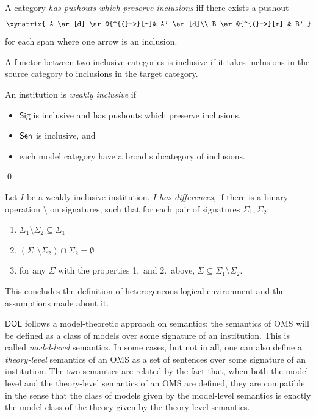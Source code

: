 \documentclass[10pt,fleqn,final]{scrreprt}
\newcommand{\cbs}[0]{\color{red}\xspace} %
\newcommand{\cbe}[0]{\color{black}\xspace} %
\newcommand{\Sig}{\mathsf{Sig}}
\newcommand*{\DOL}{\ensuremath{\mathsf{DOL}}\xspace}
\newenvironment{definitions}[0]{\medskip }{}
\begin{document}
\begin{definitions}
\noindent
A category \emph{has pushouts which preserve inclusions} iff 
there exists a pushout
$$
\xymatrix{
  A  \ar[d] \ar@{^{(}->}[r]& A' \ar[d]\\
  B \ar@{^{(}->}[r] & B'
}
$$ for each span where one arrow is an inclusion.

A functor between two inclusive categories is inclusive if it takes inclusions in the source category to inclusions in the target category.

\begin{definition}
 An institution is \emph{weakly inclusive} if
   \begin{itemize}
     \item $\Sig$ is inclusive and has pushouts which preserve inclusions,
     \item $\mathsf{Sen}$ is inclusive, and
     \item each model category have a broad subcategory of inclusions.
   \end{itemize}
\qed\end{definition}

Let $I$ be a weakly inclusive institution.  $I$  \emph{has differences}, if there is a binary operation $\setminus$ on signatures, 
such that for each pair of signatures 
$\Sigma_1, \Sigma_2$:
\begin{enumerate}
  \item $\Sigma_1\setminus \Sigma_2 \subseteq \Sigma_1$
  \item $(\Sigma_1\setminus \Sigma_2) \cap \Sigma_2 = \emptyset$
   \item for any $\Sigma$ with the properties 1.\ and 2.\ above, $\Sigma \subseteq \Sigma_1\setminus \Sigma_2$.
\end{enumerate} 
  


This concludes the definition of heterogeneous logical environment and the assumptions made about it.

\medskip



\DOL follows a model-theoretic approach on semantics: the semantics of OMS will be defined as a class of models 
over some signature of an institution. This is called \emph{model-level}  semantics. In some cases, but not in all,\cbs one\cbe can also define
a \emph{theory-level} semantics of an OMS as a set of sentences over some signature of an institution. The two semantics are 
related by the fact that, when both the model-level and the theory-level semantics of an OMS are defined, they are compatible in the 
sense that the class of models given by the model-level semantics is exactly the model class of the theory given by the
theory-level semantics. 


\end{definitions}
\end{document}
